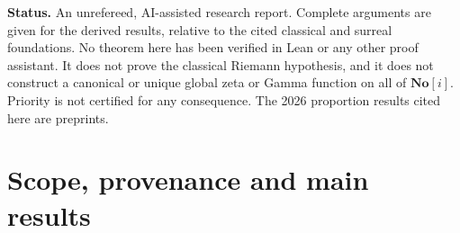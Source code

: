 \documentclass[11pt,a4paper]{article}
\numberwithin{equation}{section}
\theoremstyle{definition}
\theoremstyle{remark}
\newcommand{\No}{\mathbf{No}}
\newcommand{\zp}{\zeta^{\#}}
\begin{document}
\begin{titlepage}
\begin{abstract}
At infinite arguments, the report proves four obstructions. Reflection
forces Gamma poles on the negative infinite periods of the phase, on the
real axis. On the vertical strip of infinite height, reflection is
incompatible with the Stirling modulus except at two exceptional abscissae
for each height, and the Stirling Gamma itself, for every phase, fails
reflection at every point of the strip. Coherent Dirichlet
continuation replicates $\zp$ on resonant galaxies. Weak symmetric
completions do not determine infinite zeros. Elementary extensions
transfer RH and the classical zero theorems, and conditionally on RH and
simplicity the nonreal de Bruijn--Newman zeros at negative infinitesimal time
escape to infinite modulus. Several results needed for the reconciliation
were established during the merge; they are marked as such and listed in
the appendix.
\end{abstract}
\vfill
\noindent\small
\textbf{Status.} An unrefereed, AI-assisted research report. Complete
arguments are given for the derived results, relative to the cited
classical and surreal foundations. No theorem here has been verified in
Lean or any other proof assistant. It does not prove the classical Riemann
hypothesis, and it does not construct a canonical or unique global zeta or
Gamma function on all of $\No[i]$. Priority is not certified for any
consequence. The 2026 proportion results cited here are preprints.
\end{titlepage}
\hypersetup{pageanchor=true}
\begingroup
\footnotesize
\setlength{\parskip}{0pt}
\tableofcontents
\endgroup
\newpage

\section{Scope, provenance and main results}\label{gz:sec:intro}
\end{document}
